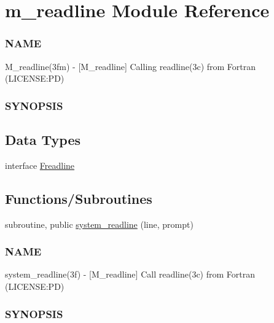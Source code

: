 \hypertarget{namespacem__readline}{}\section{m\+\_\+readline Module Reference}
\label{namespacem__readline}


\subsubsection*{N\+A\+ME}

M\+\_\+readline(3fm) -\/ \mbox{[}M\+\_\+readline\mbox{]} Calling readline(3c) from Fortran (L\+I\+C\+E\+N\+SE\+:PD) \subsubsection*{S\+Y\+N\+O\+P\+S\+IS} 


\subsection*{Data Types}
\begin{DoxyCompactItemize}
\item 
interface \mbox{\hyperlink{interfacem__readline_1_1Freadline}{Freadline}}
\end{DoxyCompactItemize}
\subsection*{Functions/\+Subroutines}
\begin{DoxyCompactItemize}
\item 
subroutine, public \mbox{\hyperlink{namespacem__readline_a6eae368d34bd43ead64623b2d6d10ae0}{system\+\_\+readline}} (line, prompt)
\begin{DoxyCompactList}\small\item\em \subsubsection*{N\+A\+ME}

system\+\_\+readline(3f) -\/ \mbox{[}M\+\_\+readline\mbox{]} Call readline(3c) from Fortran (L\+I\+C\+E\+N\+SE\+:PD) \subsubsection*{S\+Y\+N\+O\+P\+S\+IS}\end{DoxyCompactList}\end{DoxyCompactItemize}


